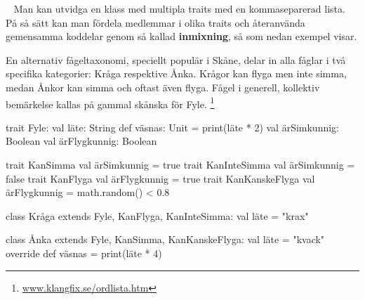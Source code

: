 













\AdvancedTasks %












\QUESTBEGIN

\Task \label{task:fyle} \what~   Man kan utvidga en klass med multipla traits med en kommaseparerad lista. På så sätt kan man fördela medlemmar i olika traits och återanvända gemensamma koddelar genom så kallad \textbf{inmixning}, så som nedan exempel visar.

En alternativ fågeltaxonomi, speciellt populär i Skåne, delar in alla fåglar i två specifika kategorier: Kråga respektive Ånka. Krågor kan flyga men inte simma, medan Ånkor kan simma och oftast även flyga. Fågel i generell, kollektiv bemärkelse kallas på gammal skånska för Fyle.%
\footnote{\href{http://www.klangfix.se/ordlista.htm}{www.klangfix.se/ordlista.htm}}

\begin{CodeSmall}
trait Fyle:
  val läte: String
  def väsnas: Unit = print(läte * 2)
  val ärSimkunnig: Boolean
  val ärFlygkunnig: Boolean

trait KanSimma       { val ärSimkunnig = true }
trait KanInteSimma   { val ärSimkunnig = false }
trait KanFlyga       { val ärFlygkunnig = true }
trait KanKanskeFlyga { val ärFlygkunnig = math.random() < 0.8 }

class Kråga extends Fyle, KanFlyga, KanInteSimma:
  val läte = "krax"

class Ånka extends Fyle, KanSimma, KanKanskeFlyga: 
  val läte = "kvack"
  override def väsnas = print(läte * 4)
\end{CodeSmall}

